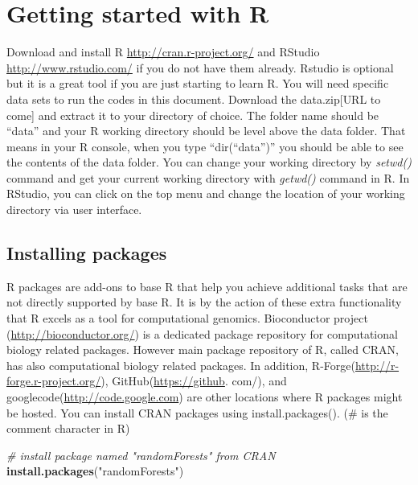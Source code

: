 \documentclass[12pt,]{krantz}
\newenvironment{Shaded}{\begin{snugshade}}{\end{snugshade}}
\newcommand{\CommentTok}[1]{\textcolor[rgb]{0.56,0.35,0.01}{\textit{#1}}}
\newcommand{\KeywordTok}[1]{\textcolor[rgb]{0.13,0.29,0.53}{\textbf{#1}}}
\newcommand{\NormalTok}[1]{#1}
\newcommand{\StringTok}[1]{\textcolor[rgb]{0.31,0.60,0.02}{#1}}
\begin{document}
\hypertarget{getting-started-with-r}{%
\section{Getting started with R}\label{getting-started-with-r}}

Download and install R \url{http://cran.r-project.org/} and RStudio \url{http://www.rstudio.com/} if you do not have them already. Rstudio is optional but it is a great tool if you are just starting to learn R.
You will need specific data sets to run the codes in this document. Download the data.zip{[}URL to come{]} and extract it to your directory of choice. The folder name should be ``data'' and your R working directory should be level above the data folder. That means in your R console, when you type ``dir(``data'')'' you should be able to see the contents of the data folder. You can change your working directory by \emph{setwd()} command and get your current working directory with \emph{getwd()} command in R. In RStudio, you can click on the top menu and change the location of your working directory via user interface.

\hypertarget{installing-packages}{%
\subsection{Installing packages}\label{installing-packages}}

R packages are add-ons to base R that help you achieve additional tasks that are not directly supported by base R. It is by the action of these extra functionality that R excels as a tool for computational genomics. Bioconductor project (\url{http://bioconductor.org/}) is a dedicated package repository for computational biology related packages. However main package repository of R, called CRAN, has also computational biology related packages. In addition, R-Forge(\url{http://r-forge.r-project.org/}), GitHub(\url{https://github}. com/), and googlecode(\url{http://code.google.com}) are other locations where R packages might be hosted.
You can install CRAN packages using install.packages(). (\# is the comment character in R)

\begin{Shaded}
\begin{Highlighting}[]
\CommentTok{# install package named "randomForests" from CRAN}
\KeywordTok{install.packages}\NormalTok{(}\StringTok{"randomForests"}\NormalTok{)}
\end{Highlighting}
\end{Shaded}
\end{document}

